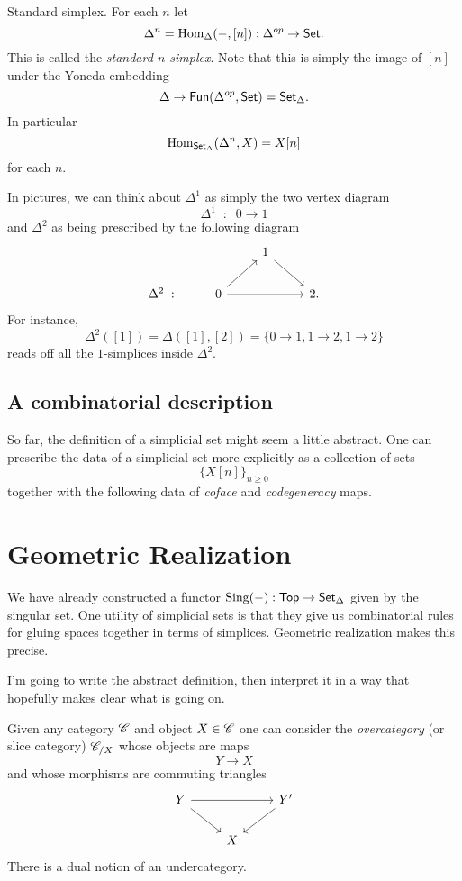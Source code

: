 \documentclass[11pt]{amsart}
\def\Fun{{\sf Fun}}
\def\Top{{\sf Top}}
\begin{document}
\begin{eg} 
Standard simplex.
For each $n$ let 
\[
\Delta^n = {\rm Hom}_{\Delta}(-, [n]) : \Delta^{op} \to {\sf Set} .
\]
This is called the {\em standard $n$-simplex}. 
Note that this is simply the image of $[n]$ under the Yoneda embedding
\[
\Delta \to \Fun(\Delta^{op}, \Set) = \Set_{\Delta} .
\]
In particular
\[
{\rm Hom}_{{\sf Set}_\Delta} (\Delta^n, X) = X[n]
\]
for each $n$. 
\end{eg}

In pictures, we can think about $\Delta^1$ as simply the two vertex diagram
\[
\Delta^1 \;\; : \;\; 0 \to 1
\]
and $\Delta^2$ as being prescribed by the following diagram
\[
\begin{tikzcd}
& & 1 \ar[dr] & \\
\Delta^2 \; :  & 0 \ar[ur] \ar[rr] && 2 . 
\end{tikzcd}
\]
For instance, 
\[
\Delta^2 ([1]) = \Delta([1],[2]) = \{0 \to 1, 1 \to 2, 1 \to 2\}
\]
reads off all the $1$-simplices inside $\Delta^2$. 

\subsection{A combinatorial description}

So far, the definition of a simplicial set might seem a little abstract. 
One can prescribe the data of a simplicial set more explicitly as a collection of sets
\[
\{X[n]\}_{n \geq 0}
\]
together with the following data of {\em coface} and {\em codegeneracy} maps. 




\section{Geometric Realization}
We have already constructed a functor ${\rm Sing} (-) : \Top \to \Set_{\Delta}$ given by the singular set. 
One utility of simplicial sets is that they give us combinatorial rules for gluing spaces together in terms of simplices. 
Geometric realization makes this precise. 

I'm going to write the abstract definition, then interpret it in a way that hopefully makes clear what is going on.

Given any category $\mathscr C$ and object $X \in \mathscr C$ one can consider the {\em overcategory} (or slice category) $\mathscr C_{/X}$ whose objects are maps
\[
Y \to X 
\]
and whose morphisms are commuting triangles
\[
\begin{tikzcd}
Y \ar[rr] \ar[dr] & & Y' \ar[dl] \\
& X & 
\end{tikzcd}
\]
There is a dual notion of an undercategory. 
\end{document}
